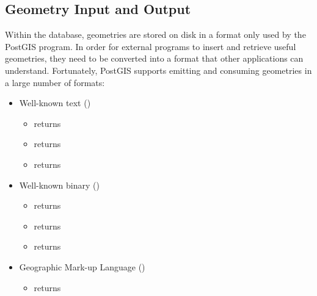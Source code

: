 \documentclass[a4paper,11pt,english]{sphinxmanual}
\begin{document}
\subsection{Geometry Input and Output}
\label{\detokenize{basic:geometry-input-and-output}}
Within the database, geometries are stored on disk in a format only used by the PostGIS program. In order for external programs to insert and retrieve useful geometries, they need to be converted into a format that other applications can understand. Fortunately, PostGIS supports emitting and consuming geometries in a large number of formats:
\begin{itemize}
\item {} 
Well-known text ({\hyperref[\detokenize{glossary:term-wkt}]{}})
\begin{itemize}
\item {} 
 returns 

\item {} 
 returns 

\item {} 
 returns 

\end{itemize}

\item {} 
Well-known binary ({\hyperref[\detokenize{glossary:term-wkb}]{}})
\begin{itemize}
\item {} 
 returns 

\item {} 
 returns 

\item {} 
 returns 

\end{itemize}

\item {} 
Geographic Mark-up Language ({\hyperref[\detokenize{glossary:term-gml}]{}})
\begin{itemize}
\item {} 
 returns 


\end{itemize}
\end{itemize}
\end{document}

